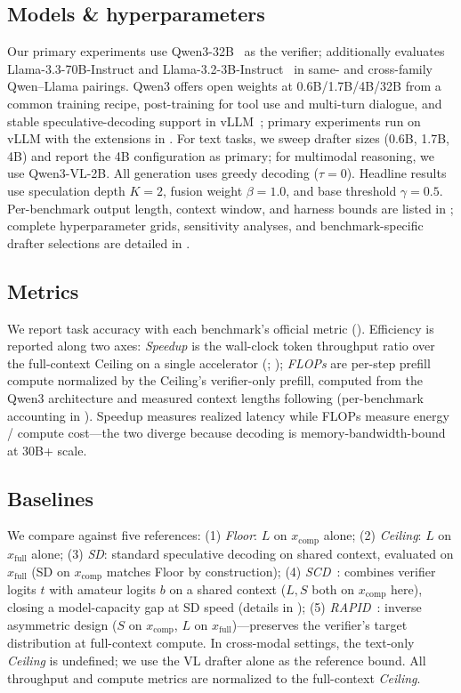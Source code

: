 \documentclass[11pt]{article}
\newcommand{\crchange}[1]{#1}
\theoremstyle{plain}
\theoremstyle{definition}
\begin{document}
\subsection{Models \& hyperparameters}
\crchange{Our primary experiments use Qwen3-32B~\citep{yang2025qwen3} as the verifier; \Cref{appx:cross-family} additionally evaluates Llama-3.3-70B-Instruct and Llama-3.2-3B-Instruct~\citep{llama2024herd} in same- and cross-family Qwen--Llama pairings.} Qwen3 offers open weights at 0.6B/1.7B/4B/32B from a common training recipe, post-training for tool use and multi-turn dialogue, and stable speculative-decoding support in vLLM~\citep{kwon2023vllm}; \crchange{primary }experiments run on vLLM with the extensions in . For text tasks, we sweep drafter sizes (0.6B, 1.7B, 4B) and report the 4B configuration as primary; for multimodal reasoning, we use Qwen3-VL-2B. All generation uses greedy decoding ($\tau=0$). Headline results use speculation depth $K=2$, fusion weight $\beta=1.0$, and base threshold $\gamma=0.5$. Per-benchmark output length, context window, and harness bounds are listed in ; complete hyperparameter grids, sensitivity analyses, and benchmark-specific drafter selections are detailed in .

\subsection{Metrics}
\label{sec:metrics}
We report task accuracy with each benchmark's official metric (). Efficiency is reported along two axes: \emph{Speedup} is the wall-clock token throughput ratio over the full-context Ceiling on a single accelerator (; ); \emph{FLOPs} are per-step prefill compute normalized by the Ceiling's verifier-only prefill, computed from the Qwen3 architecture and measured context lengths following \citet{kaplan2020scaling} (per-benchmark accounting in ). Speedup measures realized latency while FLOPs measure energy / compute cost---the two diverge because decoding is memory-bandwidth-bound at 30B+ scale.

\subsection{Baselines}
We compare against five references:
(1) \emph{Floor}: $L$ on $x_{\text{comp}}$ alone; 
(2) \emph{Ceiling}: $L$ on $x_{\text{full}}$ alone; 
(3) \emph{SD}: standard speculative decoding on shared context, evaluated on $x_{\text{full}}$ (SD on $x_{\text{comp}}$ matches Floor by construction); 
(4) \emph{SCD}~\citep{yuan2023scd}: combines verifier logits $t$ with amateur logits $b$ on a shared context ($L,S$ both on $x_{\text{comp}}$ here), closing a model-capacity gap at SD speed (details in );
(5) \emph{RAPID}~\citep{liu2025rapid}: inverse asymmetric design ($S$ on $x_{\text{comp}}$, $L$ on $x_{\text{full}}$)---preserves the verifier's target distribution at full-context compute. In cross-modal settings, the text-only \emph{Ceiling} is undefined; we use the VL drafter alone as the reference bound. All throughput and compute metrics are normalized to the full-context \emph{Ceiling}.
\end{document}
